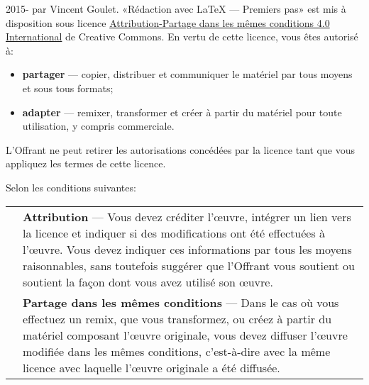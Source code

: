 
\begin{frame}[t,plain,fragile=singleslide]
  \tiny
  \vspace*{10mm}

  \begin{adjustwidth}{15mm}{15mm}
    {\ccbysa} 2015-{\year} par Vincent Goulet. «Rédaction avec
    {\LaTeX} --- Premiers pas» est mis à disposition sous licence
    \href{https://creativecommons.org/licenses/by-sa/4.0/deed.fr}{%
      Attribution-Partage dans les mêmes conditions 4.0 International}
    de Creative Commons. En vertu de cette licence, vous êtes autorisé
    à:
    \begin{itemize}
    \item \textbf{partager} --- copier, distribuer et communiquer le
      matériel par tous moyens et sous tous formats;
    \item \textbf{adapter} --- remixer, transformer et créer à partir du
      matériel pour toute utilisation, y compris commerciale.
    \end{itemize}
    L'Offrant ne peut retirer les autorisations concédées par la licence
    tant que vous appliquez les termes de cette licence.

    Selon les conditions suivantes: \par
    \begin{tabularx}{\linewidth}{@{}lX@{}}
      \raisebox{-11pt}{\fontsize{16}{16}\selectfont\faCreativeCommonsBy}
      & \textbf{Attribution} --- Vous devez créditer l'œuvre, intégrer
        un lien vers la licence et indiquer si des modifications ont été
        effectuées à l'œuvre. Vous devez indiquer ces informations par
        tous les moyens raisonnables, sans toutefois suggérer que
        l'Offrant vous soutient ou soutient la façon dont vous avez utilisé
        son œuvre. \\
      \raisebox{-11pt}{\fontsize{16}{16}\selectfont\faCreativeCommonsSa}
      & \textbf{Partage dans les mêmes conditions} --- Dans le cas où vous
        effectuez un remix, que vous transformez, ou créez à partir du
        matériel composant l'œuvre originale, vous devez diffuser l'œuvre modifiée dans
        les mêmes conditions, c'est-à-dire avec la même licence avec laquelle
        l'œuvre originale a été diffusée.
    \end{tabularx}


\end{adjustwidth}
\end{frame}
